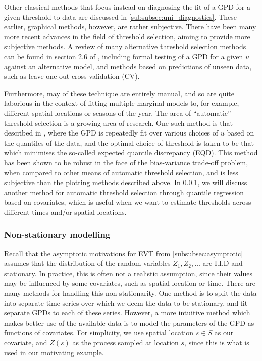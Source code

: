 \documentclass{article}
\numberwithin{equation}{section}
\begin{document}
Other classical methods that focus instead on diagnosing the fit of a GPD for a given threshold to data are discussed in \ref{subsubsec:uni_diagnostics}.
These earlier, graphical methods, however, are rather subjective.
There have been many more recent advances in the field of threshold selection, aiming to provide more subjective methods. 
A review of many alternative threshold selection methods can be found in section 2.6 of \cite{Belzize2022}, including formal testing of a GPD for a given $u$ against an alternative model, and methods based on predictions of unseen data, such as leave-one-out cross-validation (CV). 

Furthermore, may of these technique are entirely manual, and so are quite laborious in the context of fitting multiple marginal models to, for example, different spatial locations or seasons of the year.
The area of ``automatic'' threshold selection is a growing area of research. 
One such method is that described in \cite{Murphy2024}, where the GPD is repeatedly fit over various choices of $u$ based on the quantiles of the data, and the optimal choice of threshold is taken to be that which minimises the so-called expected quantile discrepancy (EQD).
This method has been shown to be robust in the face of the bias-variance trade-off problem, when compared to other means of automatic threshold selection, and is less subjective than the plotting methods described above. 
In \ref{subsubsec:non_stationary}, we will discuss another method for automatic threshold selection through quantile regression based on covariates, which is useful when we want to estimate thresholds across different times and/or spatial locations.

\subsubsection{Non-stationary modelling} \label{subsubsec:non_stationary}

Recall that the asymptotic motivations for EVT from \ref{subsubsec:asymptotic} assumes that the distribution of the random variables $Z_1, Z_2, \ldots$ are I.I.D and stationary.
In practice, this is often not a realistic assumption, since their values may be influenced by some covariates, such as spatial location or time.
There are many methods for handling this non-stationarity. 
One method is to split the data into separate time series over which we deem the data to be stationary, and fit separate GPDs to each of these series.
However, a more intuitive method which makes better use of the available data is to model the parameters of the GPD as functions of covariates. 
For simplicity, we use spatial location $s \in S$ as our covariate, and $Z(s)$ as the process sampled at location $s$, since this is what is used in our motivating example. 
\end{document}
